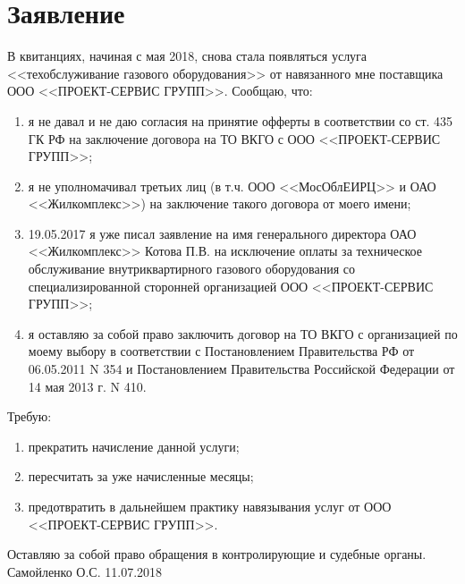 \documentclass[a4paper,12pt]{article}
\begin{document}
\section*{Заявление}

В квитанциях, начиная с мая 2018, снова стала появляться услуга <<техобслуживание газового оборудования>> от навязанного мне поставщика ООО <<ПРОЕКТ-СЕРВИС ГРУПП>>.
Сообщаю, что:
\begin{enumerate}
	\item я не давал и не даю согласия на принятие офферты в соответствии со ст. 435 ГК РФ на заключение договора на ТО ВКГО с ООО <<ПРОЕКТ-СЕРВИС ГРУПП>>;
	\item я не уполномачивал третьих лиц (в т.ч. ООО <<МосОблЕИРЦ>> и ОАО <<Жилкомплекс>>) на заключение такого договора от моего имени;
	\item 19.05.2017 я уже писал заявление на имя генерального директора ОАО <<Жилкомплекс>> Котова П.В. на исключение оплаты за техническое обслуживание внутриквартирного газового оборудования со специализированной сторонней организацией ООО <<ПРОЕКТ-СЕРВИС ГРУПП>>;
	\item я оставляю за собой право заключить договор на ТО ВКГО с организацией по моему выбору в соответствии с Постановлением Правительства РФ от 06.05.2011 N 354 и Постановлением Правительства Российской Федерации от 14 мая 2013 г. N 410.
\end{enumerate}

Требую:
\begin{enumerate}
	\item прекратить начисление данной услуги;
	\item пересчитать за уже начисленные месяцы;
	\item предотвратить в дальнейшем практику навязывания услуг от ООО <<ПРОЕКТ-СЕРВИС ГРУПП>>.
\end{enumerate}

Оставляю за собой право обращения в контролирующие и судебные органы.\\

Самойленко О.С.
11.07.2018
\end{document}
